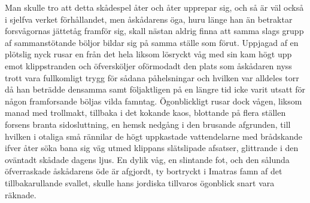 Man skulle tro att detta skådespel åter och åter upprepar sig, och så är
väl också i sjelfva verket förhållandet, men åskådarens öga, huru länge
han än betraktar forsvågornas jättetåg framför sig, skall nästan aldrig
finna att samma slags grupp af sammanstötande böljor bildar sig på samma
ställe som förut. Uppjagad af en plötslig nyck rusar en från det hela
liksom lösryckt våg med sin kam högt upp emot klippstranden och
öfversköljer oförmodadt den plats som åskådaren nyss trott vara
fullkomligt trygg för sådana påhelsningar och hvilken var alldeles torr
då han beträdde densamma samt följaktligen på en längre tid icke varit
utsatt för någon framforsande böljas vilda famntag. Ögonblickligt rusar
dock vågen, liksom manad med trollmakt, tillbaka i det kokande kaos,
blottande på flera ställen forsens branta sidosluttning, en hemsk
nedgång i den brusande afgrunden, till hvilken i otaliga små rännilar de
högt uppkastade vattendelarne med brådskande ifver åter söka bana sig
väg utmed klippans slätslipade afsatser, glittrande i den oväntadt
skådade dagens ljus. En dylik våg, en slintande fot, och den sålunda
öfverraskade åskådarens öde är afgjordt, ty bortryckt i Imatras famn af
det tillbakarullande svallet, skulle hans jordiska tillvaros ögonblick
snart vara räknade.

